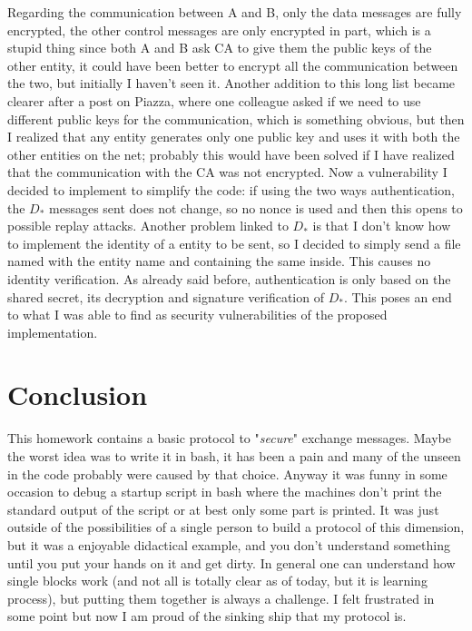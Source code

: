 \documentclass{article}
\begin{document}
Regarding the communication between A and B, only the data messages are fully encrypted, the other control messages are only encrypted in part, which is a stupid thing since both A and B ask CA to give them the public keys of the other entity, it could have been better to encrypt all the communication between the two, but initially I haven't seen it.\newline
Another addition to this long list became clearer after a post on Piazza, where one colleague asked if we need to use different public keys for the communication, which is something obvious, but then I realized that any entity generates only one public key and uses it with both the other entities on the net; probably this would have been solved if I have realized that the communication with the CA was not encrypted.\newline
Now a vulnerability I decided to implement to simplify the code: if using the two ways authentication, the $D_*$ messages sent does not change, so no nonce is used and then this opens to possible replay attacks. Another problem linked to $D_*$ is that I don't know how to implement the identity of a entity to be sent, so I decided to simply send a file named with the entity name and containing the same inside. This causes no identity verification. As already said before, authentication is only based on the shared secret, its decryption and signature verification of $D_*$.\newline
This poses an end to what I was able to find as security vulnerabilities of the proposed implementation.


\section{Conclusion}

This homework contains a basic protocol to "\textit{secure}" exchange messages. Maybe the worst idea was to write it in bash, it has been a pain and many of the unseen in the code probably were caused by that choice. Anyway it was funny in some occasion to debug a startup script in bash where the machines don't print the standard output of the script or at best only some part is printed. It was just outside of the possibilities of a single person to build a protocol of this dimension, but it was a enjoyable didactical example, and you don't understand something until you put your hands on it and get dirty. In general one can understand how single blocks work (and not all is totally clear as of today, but it is learning process), but putting them together is always a challenge. I felt frustrated in some point but now I am proud of the sinking ship that my protocol is.
\end{document}
